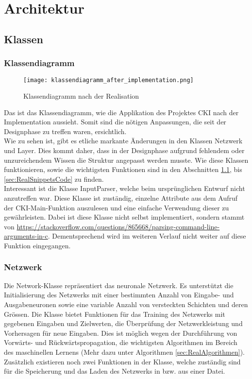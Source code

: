 \section{Architektur}
\label{sec:RealArchitektur}
\subsection{Klassen}
\label{sec:RealKlassen}
\subsubsection{Klassendiagramm}
\label{sec:RealKlassendiagramm}
\begin{figure}[H]
	\centering
		\texttt{[image: klassendiagramm\_after\_implementation.png]}
		\caption{Klassendiagramm nach der Realisation}
	\label{fig:klassendiagramm after implementation}
\end{figure}
Das ist das Klassendiagramm, wie die Applikation des Projektes CKI nach der Implementation aussieht. Somit sind die nötigen Anpassungen, die seit der Designphase zu treffen waren, ersichtlich.
\\
Wie zu sehen ist, gibt es etliche markante Änderungen in den Klassen Netzwerk und Layer. Dies kommt daher, dass in der Designphase aufgrund fehlendem oder unzureichendem Wissen die Struktur angepasst werden musste. Wie diese Klassen funktionieren, sowie die wichtigsten Funktionen sind in den Abschnitten \ref{sec:RealKlassen}, bis \ref{sec:RealSnippetsCode} zu finden. 
\\
Interessant ist die Klasse InputParser, welche beim ursprünglichen Entwurf nicht anzutreffen war. Diese Klasse ist zuständig, einzelne Attribute aus dem Aufruf der CKI-Main-Funktion auszulesen und eine einfache Verwendung dieser zu gewährleisten. Dabei ist diese Klasse nicht selbst implementiert, sondern stammt von \url{https://stackoverflow.com/questions/865668/parsing-command-line-arguments-in-c}. Dementsprechend wird im weiteren Verlauf nicht weiter auf diese Funktion eingegangen.

\subsubsection{Netzwerk}
\label{sec:RealNetzwerk}
Die Network-Klasse repräsentiert das neuronale Netzwerk. Es unterstützt die Initialisierung des Netzwerks mit einer bestimmten Anzahl von Eingabe- und Ausgabeneuronen sowie eine variable Anzahl von versteckten Schichten und deren Grössen. Die Klasse bietet Funktionen für das Training des Netzwerks mit gegebenen Eingaben und Zielwerten, die Überprüfung der Netzwerkleistung und Vorhersagen für neue Eingaben. Dies ist möglich wegen der Durchführung von Vorwärts- und Rückwärtspropagation, die wichtigsten Algorithmen im Bereich des maschinellen Lernens (Mehr dazu unter Algorithmen \ref{sec:RealAlgorithmen}).
\\
Zusätzlich existieren noch zwei Funktionen in der Klasse, welche zuständig sind für die Speicherung und das Laden des Netzwerks in bzw. aus einer Datei.

